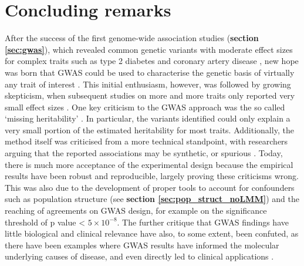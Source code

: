 
\chapter{Concluding remarks}  %
\label{chapter7}

After the success of the first genome-wide association studies (\textbf{section 
\ref{sec:gwas}}), which revealed common genetic variants with moderate effect sizes for complex traits such as type 2 diabetes \cite{scott2007genome} and coronary artery disease \cite{wellcome2007genome}, new hope was born that GWAS could be used to characterise the genetic basis of virtually any trait of interest \cite{visscher2012five}. 
This initial enthusiasm, however, was followed by growing skepticism, when subsequent studies on more and more traits only reported very small effect sizes \cite{hardy2009genomewide}.
One key criticism to the GWAS approach was 
the so called `missing heritability' \cite{manolio2009finding}.
In particular, the variants identified could only explain a very small portion of the estimated heritability for most traits.
Additionally, the method itself was criticised from a more technical standpoint, with researchers arguing that the reported associations may be synthetic, or spurious \cite{maher2008case}.
Today, there is much more acceptance of the experimental design because the empirical results have been robust and reproducible, largely proving these criticisms wrong.
This was also due to the development of proper tools to account for confounders such as population structure (see \textbf{section 
\ref{sec:pop_struct_noLMM}}) and the reaching of agreements on GWAS design, for example on the significance threshold of p value < $5 \times 10^{-8}$.
The further critique that GWAS findings have little biological and clinical relevance have also, to some extent, been confuted, as there have been examples where GWAS results have informed the molecular underlying causes of disease, and even directly led to clinical applications \cite{visscher201710}. \\

